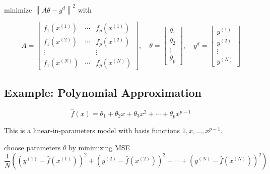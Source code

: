 \begin{problem}
    minimize $ \left\|A \theta-y^{{d}}\right\|^{2} $ with

\begin{equation}
A=\left[\begin{array}{ccc}
f_{1}\left(x^{(1)}\right) & \cdots & f_{p}\left(x^{(1)}\right) \\
f_{1}\left(x^{(2)}\right) & \cdots & f_{p}\left(x^{(2)}\right) \\
\vdots & & \vdots \\
f_{1}\left(x^{(N)}\right) & \cdots & f_{p}\left(x^{(N)}\right)
\end{array}\right], \quad \theta=\left[\begin{array}{c}
\theta_{1} \\
\theta_{2} \\
\vdots \\
\theta_{p}
\end{array}\right], \quad y^{{d}}=\left[\begin{array}{c}
y^{(1)} \\
y^{(2)} \\
\vdots \\
y^{(N)}
\end{array}\right]
\end{equation}
\end{problem}



\subsection{Example: Polynomial Approximation}

\begin{problem}
    \begin{equation}
\hat{f}(x)=\theta_{1}+\theta_{2} x+\theta_{3} x^{2}+\cdots+\theta_{p} x^{p-1}
\end{equation}
\end{problem}

This is a linear-in-parameters model with basis functions $ 1, x, \ldots, x^{p-1} $.

\begin{problem}
    choose parameters $ \theta $ by minimizing MSE
\begin{equation}
\frac{1}{N}\left(\left(y^{(1)}-\hat{f}\left(x^{(1)}\right)\right)^{2}+\left(y^{(2)}-\hat{f}\left(x^{(2)}\right)\right)^{2}+\cdots+\left(y^{(N)}-\hat{f}\left(x^{(N)}\right)\right)^{2}\right)
\end{equation}
\end{problem}

